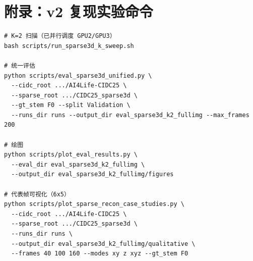 \documentclass[UTF8, scheme=plain, 11pt, a4paper]{ctexart}
\begin{document}
\section*{附录：v2 复现实验命令}
\begin{verbatim}
# K=2 扫描（已并行调度 GPU2/GPU3）
bash scripts/run_sparse3d_k_sweep.sh

# 统一评估
python scripts/eval_sparse3d_unified.py \
  --cidc_root .../AI4Life-CIDC25 \
  --sparse_root .../CIDC25_sparse3d \
  --gt_stem F0 --split Validation \
  --runs_dir runs --output_dir eval_sparse3d_k2_fullimg --max_frames 200

# 绘图
python scripts/plot_eval_results.py \
  --eval_dir eval_sparse3d_k2_fullimg \
  --output_dir eval_sparse3d_k2_fullimg/figures

# 代表帧可视化（6x5）
python scripts/plot_sparse_recon_case_studies.py \
  --cidc_root .../AI4Life-CIDC25 \
  --sparse_root .../CIDC25_sparse3d \
  --runs_dir runs \
  --output_dir eval_sparse3d_k2_fullimg/qualitative \
  --frames 40 100 160 --modes xy z xyz --gt_stem F0
\end{verbatim}
\end{document}
